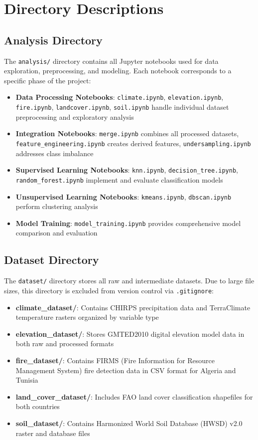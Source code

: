 \section*{Directory Descriptions}

\subsection*{Analysis Directory}
The \texttt{analysis/} directory contains all Jupyter notebooks used for data exploration, preprocessing, and modeling. Each notebook corresponds to a specific phase of the project:

\begin{itemize}
    \item \textbf{Data Processing Notebooks}: \texttt{climate.ipynb}, \texttt{elevation.ipynb}, \texttt{fire.ipynb}, \texttt{landcover.ipynb}, \texttt{soil.ipynb} handle individual dataset preprocessing and exploratory analysis
    \item \textbf{Integration Notebooks}: \texttt{merge.ipynb} combines all processed datasets, \texttt{feature\_engineering.ipynb} creates derived features, \texttt{undersampling.ipynb} addresses class imbalance
    \item \textbf{Supervised Learning Notebooks}: \texttt{knn.ipynb}, \texttt{decision\_tree.ipynb}, \texttt{random\_forest.ipynb} implement and evaluate classification models
    \item \textbf{Unsupervised Learning Notebooks}: \texttt{kmeans.ipynb}, \texttt{dbscan.ipynb} perform clustering analysis
    \item \textbf{Model Training}: \texttt{model\_training.ipynb} provides comprehensive model comparison and evaluation
\end{itemize}

\subsection*{Dataset Directory}
The \texttt{dataset/} directory stores all raw and intermediate datasets. Due to large file sizes, this directory is excluded from version control via \texttt{.gitignore}:

\begin{itemize}
    \item \textbf{climate\_dataset/}: Contains CHIRPS precipitation data and TerraClimate temperature rasters organized by variable type
    \item \textbf{elevation\_dataset/}: Stores GMTED2010 digital elevation model data in both raw and processed formats
    \item \textbf{fire\_dataset/}: Contains FIRMS (Fire Information for Resource Management System) fire detection data in CSV format for Algeria and Tunisia
    \item \textbf{land\_cover\_dataset/}: Includes FAO land cover classification shapefiles for both countries
    \item \textbf{soil\_dataset/}: Contains Harmonized World Soil Database (HWSD) v2.0 raster and database files
\end{itemize}

